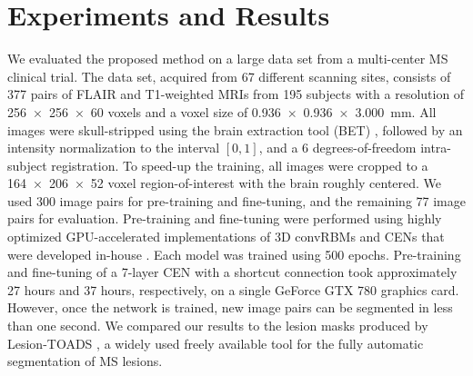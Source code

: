 
\section{Experiments and Results}






We evaluated the proposed method on a large data set from a multi-center MS
clinical trial. The data set, acquired from 67 different scanning sites,
consists of 377 pairs of FLAIR and T1-weighted MRIs from 195 subjects with a
resolution of \num{256x256x60} voxels and a voxel size of
\SI{0.936x0.936x3.000}{\milli\metre}. All images were skull-stripped using the
brain extraction tool (BET) \cite{jenkinson2005bet2}, followed by an intensity
normalization to the interval $[0,1]$, and a 6 degrees-of-freedom intra-subject
registration. To speed-up the training, all images were cropped to a
\num{164x206x52} voxel region-of-interest with the brain roughly centered. We
used 300 image pairs for pre-training and fine-tuning, and the remaining 77
image pairs for evaluation. Pre-training and fine-tuning were performed using
highly optimized GPU-accelerated implementations of 3D convRBMs and CENs that
were developed in-house \cite{brosch2014efficient}. Each model was trained using
500 epochs. Pre-training and fine-tuning of a 7-layer CEN with a shortcut connection
took approximately 27 hours and 37 hours, respectively, on a single GeForce GTX
780 graphics card. However, once the network is trained, new image pairs can be
segmented in less than one second. We compared our results to the lesion masks
produced by Lesion-TOADS \cite{shiee2010topology}, a widely used freely
available tool for the fully automatic segmentation of MS lesions.

